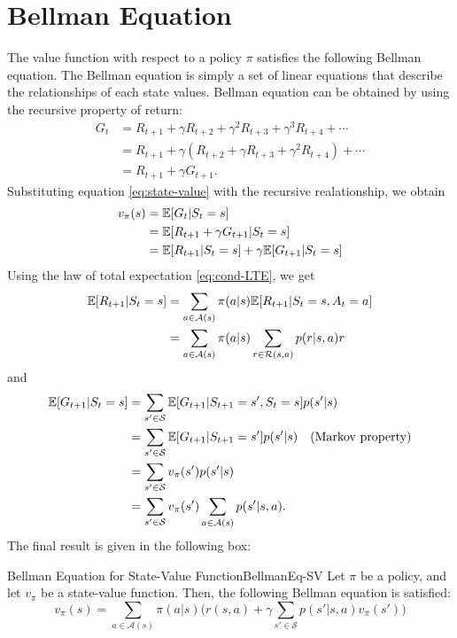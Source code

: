 \section{Bellman Equation}
    The value function with respect to a policy $\pi$ satisfies the following Bellman equation.
    The Bellman equation is simply a set of linear equations that describe the relationships of each state values.
    Bellman equation can be obtained by using the recursive property of return:
    \begin{align}
        G_t &= R_{t+1} + \gamma R_{t+2} + \gamma^2 R_{t+3} + \gamma^3 R_{t+4} + \cdots \\
            &= R_{t+1} + \gamma (R_{t+2} + \gamma R_{t+3} + \gamma^2 R_{t+4}) + \cdots \\
            &= R_{t+1} + \gamma G_{t+1}.
    \end{align}
    Substituting equation \ref{eq:state-value} with the recursive realationship, we obtain
    \begin{align}
        v_\pi(s) &= \mathbb{E}[G_t|S_t=s] \\
                    &= \mathbb{E}[R_{t+1} + \gamma G_{t+1}|S_t=s] \\
                    &= \mathbb{E}[R_{t+1}|S_t=s] + \gamma \mathbb{E}[G_{t+1}|S_t=s]
    \end{align} 
    Using the law of total expectation \ref{eq:cond-LTE}, we get
    \begin{align}
        \mathbb{E}[R_{t+1}|S_t=s] &= \sum_{a \in \mathcal{A}(s)}\pi(a|s)\mathbb{E}[R_{t+1}|S_t=s,A_t=a] \\
                            &= \sum_{a \in \mathcal{A}(s)}\pi(a|s)\sum_{r \in \mathcal{R}(s,a)}p(r|s,a)r
    \end{align}
    and
    \begin{align}
        \mathbb{E}[G_{t+1}|S_t=s] &= \sum_{s' \in \mathcal{S}}\mathbb{E}[G_{t+1}|S_{t+1}=s',S_t=s]p(s'|s) \\
                            &= \sum_{s' \in \mathcal{S}}\mathbb{E}[G_{t+1}|S_{t+1}=s']p(s'|s) \quad \text{(Markov property)} \\
                            &= \sum_{s' \in \mathcal{S}}v_\pi(s')p(s'|s) \\
                            &= \sum_{s' \in \mathcal{S}}v_\pi(s')\sum_{a \in \mathcal{A}(s)}p(s'|s,a).
    \end{align}
    The final result is given in the following box:
    \begin{thm}{Bellman Equation for State-Value Function}{BellmanEq-SV}
        Let $\pi$ be a policy, and let $v_\pi$ be a state-value function. Then, the following Bellman equation is satisfied:
        \begin{equation}
            v_\pi(s) = \sum_{a \in \mathcal{A}(s)}\pi(a|s) \Big(r(s,a) + \gamma \sum_{s' \in \mathcal{S}}p(s'|s,a)v_\pi(s')\Big)
        \end{equation}
    \end{thm}

